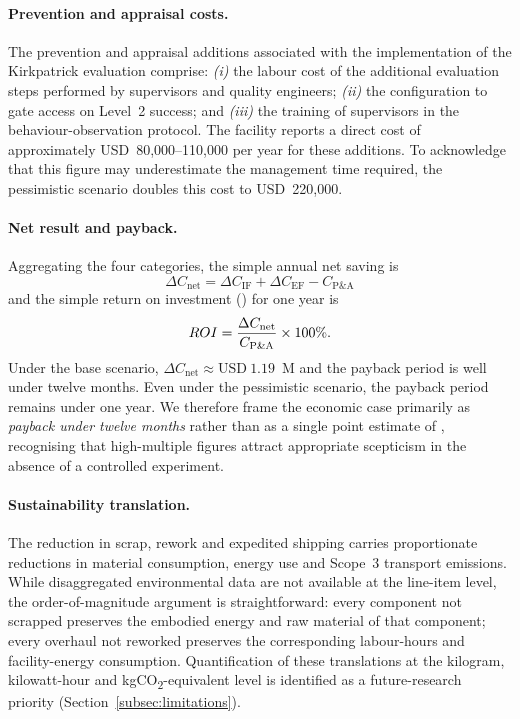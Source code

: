 \paragraph{Prevention and appraisal costs.}
The prevention and appraisal additions associated with the implementation
of the Kirkpatrick evaluation comprise: \textit{(i)} the labour cost of
the additional evaluation steps performed by supervisors and quality
engineers; \textit{(ii)} the \LMS{} configuration to gate \ERP{} access on
Level~2 success; and \textit{(iii)} the training of supervisors in the
behaviour-observation protocol. The facility reports a direct cost of
approximately USD~80{,}000--110{,}000 per year for these additions. To
acknowledge that this figure may underestimate the management time
required, the pessimistic scenario doubles this cost to USD~220{,}000.

\paragraph{Net result and payback.}
Aggregating the four categories, the simple annual net saving is
\begin{equation}
  \Delta C_{\text{net}} = \Delta C_{\text{IF}} + \Delta C_{\text{EF}}
                          - C_{\text{P\&A}}
  \label{eq:net}
\end{equation}
and the simple return on investment (\ROI{}) for one year is
\begin{equation}
  ROI = \frac{\Delta C_{\text{net}}}{C_{\text{P\&A}}} \times 100\%.
  \label{eq:roi}
\end{equation}
Under the base scenario, $\Delta C_{\text{net}} \approx
\text{USD}~1.19$~M and the payback period is well under twelve months.
Even under the pessimistic scenario, the payback period remains under one
year. We therefore frame the economic case primarily as
\emph{payback under twelve months} rather than as a single point estimate
of \ROI{}, recognising that high-multiple \ROI{} figures attract
appropriate scepticism in the absence of a controlled experiment.



\paragraph{Sustainability translation.}
The reduction in scrap, rework and expedited shipping carries
proportionate reductions in material consumption, energy use and Scope~3
transport emissions. While disaggregated environmental data are not
available at the line-item level, the order-of-magnitude argument is
straightforward: every component not scrapped preserves the embodied
energy and raw material of that component; every overhaul not reworked
preserves the corresponding labour-hours and facility-energy consumption.
Quantification of these translations at the kilogram, kilowatt-hour and
kgCO\textsubscript{2}-equivalent level is identified as a future-research
priority (Section~\ref{subsec:limitations}).
